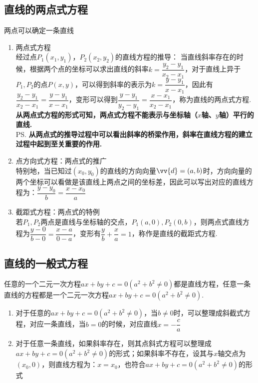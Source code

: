 \subsection*{直线的两点式方程}
两点可以确定一条直线
\begin{enumerate}
    \item 两点式方程 \\
    经过点$P_1(x_1, y_1)， P_2(x_2, y_2)$的直线方程的推导：
    当直线斜率存在的时候，根据两个点的坐标可以求出直线的斜率$k = \dfrac{y_2 - y_1}{x_2 - x_1}$，对于直线上异于$P_1, P_2$的点$P(x, y)$，可以得到斜率的表示为$k = \dfrac{y - y_1}{x - x_1}$，因此有$\dfrac{y_2 - y_1}{x_2 - x_1} = \dfrac{y - y_1}{x - x_1}$，变形可以得到$\dfrac{y - y_1}{y_2 - y_1} = \dfrac{x - x_1}{x_2 - x_1}$，称为直线的两点式方程. \\
    \textbf{从两点式方程的形式可知，两点式方程不能表示与坐标轴（$x$轴、$y$轴）平行的直线.} \\
    \ps \textbf{从两点式的推导过程中可以看出斜率的桥梁作用，斜率在直线方程的建立过程中起到至关重要的作用.} 
    \item 点方向式方程：两点式的推广 \\
    特别地，当已知过$(x_0, y_0)$的直线的方向向量$\vv{d} =  (a, b)$时，方向向量的两个坐标可以看做是该直线上两点之间的坐标差，因此可以写出对应的直线方程为：$\dfrac{y-y_0}{b} = \dfrac{x-x_0}{a}$
    \item 截距式方程：两点式的特例 \\
    若$P_1, P_2$两点是直线与坐标轴的交点，$P_1(a, 0), P_2(0, b)$，则两点式直线方程为$\dfrac{y-0}{b-0} = \dfrac{x-a}{0-a}$，变形有$\dfrac{y}{b}+\dfrac{x}{a} = 1$，称作是直线的截距式方程.
\end{enumerate}
\subsection*{直线的一般式方程}
任意的一个二元一次方程$ax+by+c = 0(a^2+b^2 \neq 0)$都是直线方程，任意一条直线的方程都是一个二元一次方程$ax+by+c = 0(a^2+b^2 \neq 0)$.
\begin{enumerate}
    \item 对于任意的$ax+by+c = 0(a^2+b^2 \neq 0)$，当$b \neq 0$时，可以整理成斜截式方程，对应一条直线，当$b = 0$的时候，对应直线$x = -\dfrac{c}{a}$
    \item 对于任意一条直线，如果斜率存在，则其点斜式方程可以整理成$ax+by+c = 0(a^2+b^2 \neq 0)$的形式；如果斜率不存在，设其与$x$轴交点为$(x_0, 0)$，则直线方程为：$x = x_0$，也符合$ax+by+c = 0(a^2+b^2 \neq 0)$的形式
\end{enumerate}

